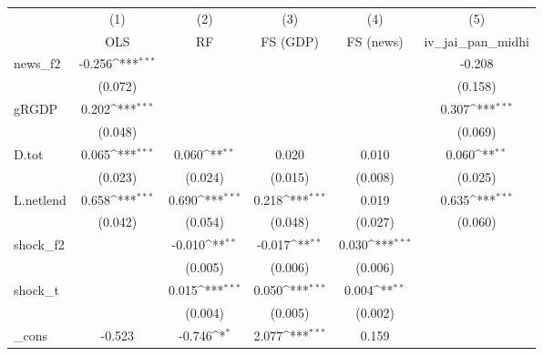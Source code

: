 {
\def\sym#1{\ifmmode^{#1}\else\(^{#1}\)\fi}
\begin{tabular}{l*{5}{c}}
\toprule
            &\multicolumn{1}{c}{(1)}&\multicolumn{1}{c}{(2)}&\multicolumn{1}{c}{(3)}&\multicolumn{1}{c}{(4)}&\multicolumn{1}{c}{(5)}\\
            &\multicolumn{1}{c}{OLS}&\multicolumn{1}{c}{RF}&\multicolumn{1}{c}{FS (GDP)}&\multicolumn{1}{c}{FS (news)}&\multicolumn{1}{c}{iv\_jai\_pan\_midhi}\\
\midrule
news\_f2     &      -0.256\sym{***}&                     &                     &                     &      -0.208         \\
            &     (0.072)         &                     &                     &                     &     (0.158)         \\
\addlinespace
gRGDP       &       0.202\sym{***}&                     &                     &                     &       0.307\sym{***}\\
            &     (0.048)         &                     &                     &                     &     (0.069)         \\
\addlinespace
D.tot       &       0.065\sym{***}&       0.060\sym{**} &       0.020         &       0.010         &       0.060\sym{**} \\
            &     (0.023)         &     (0.024)         &     (0.015)         &     (0.008)         &     (0.025)         \\
\addlinespace
L.netlend   &       0.658\sym{***}&       0.690\sym{***}&       0.218\sym{***}&       0.019         &       0.635\sym{***}\\
            &     (0.042)         &     (0.054)         &     (0.048)         &     (0.027)         &     (0.060)         \\
\addlinespace
shock\_f2    &                     &      -0.010\sym{**} &      -0.017\sym{**} &       0.030\sym{***}&                     \\
            &                     &     (0.005)         &     (0.006)         &     (0.006)         &                     \\
\addlinespace
shock\_t     &                     &       0.015\sym{***}&       0.050\sym{***}&       0.004\sym{**} &                     \\
            &                     &     (0.004)         &     (0.005)         &     (0.002)         &                     \\
\addlinespace
\_cons      &      -0.523         &      -0.746\sym{*}  &       2.077\sym{***}&       0.159         &                     \\

\end{tabular}}

